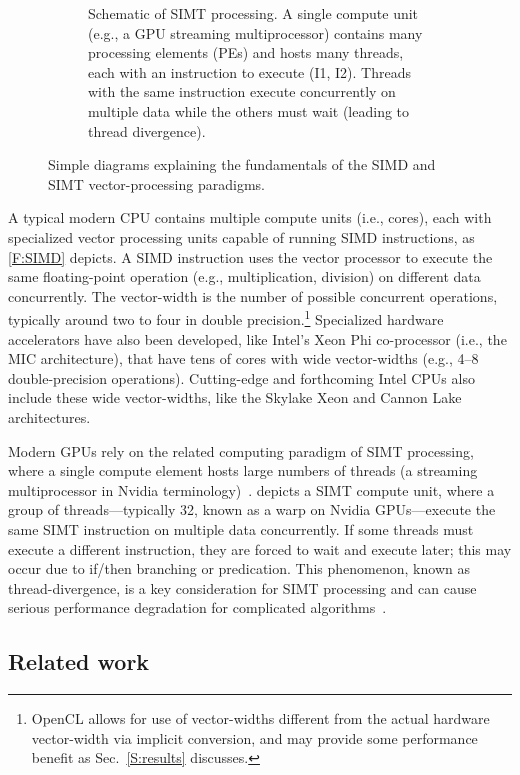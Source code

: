 \documentclass[12pt,number,sort&compress,preprint]{elsarticle}
\begin{document}
\begin{figure}[htb]
\begin{subfigure}[t]{0.45\linewidth}
      \caption{Schematic of SIMT processing. A single compute unit (e.g., a GPU streaming multiprocessor) contains many processing elements (PEs) and hosts many threads, each with an instruction to execute (I1, I2).  Threads with the same instruction execute concurrently on multiple data while the others must wait (leading to thread divergence).}
      \label{F:SIMT}
  \end{subfigure}
  \caption{Simple diagrams explaining the fundamentals of the SIMD and SIMT vector-processing paradigms.}
\end{figure}

A typical modern CPU contains multiple compute units (i.e., cores), each with specialized vector processing units capable of running SIMD instructions, as \cref{F:SIMD} depicts.
A SIMD instruction uses the vector processor to execute the same floating-point operation (e.g., multiplication, division) on different data concurrently.
The vector-width is the number of possible concurrent operations, typically around two to four in double precision.\footnote{OpenCL allows for use of vector-widths different from the actual hardware vector-width via implicit conversion, and may provide some performance benefit as Sec.~\ref{S:results} discusses.}
Specialized hardware accelerators have also been developed, like Intel's Xeon Phi co-processor (i.e., the MIC architecture), that have tens of cores with wide vector-widths (e.g., \numrange{4}{8} double-precision operations).
Cutting-edge and forthcoming Intel CPUs also include these wide vector-widths, like the Skylake Xeon and Cannon Lake architectures.

Modern GPUs rely on the related computing paradigm of SIMT processing, where a single compute element hosts large
numbers of threads (a streaming multiprocessor in Nvidia terminology)~\cite{lindholm2008Nvidia}.
 depicts a SIMT compute unit, where a group of threads---typically \num{32}, known as a warp on Nvidia GPUs---execute the same SIMT instruction on multiple data concurrently.
If some threads must execute a different instruction, they are forced to wait and execute later; this may occur due to if\slash then branching or predication.
This phenomenon, known as thread-divergence, is a key consideration for SIMT processing and can cause serious performance degradation for complicated algorithms~\cite{CurtisGPU:2017}.

\subsection{Related work}
\label{S:related}
\end{document}
